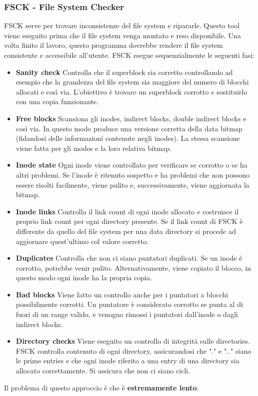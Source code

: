 \documentclass[12pt, twoside, letterpaper]{article}
\begin{document}
			\subsubsection{FSCK - File System Checker}
				FSCK serve per trovare inconsistenze del file system e ripararle. Questo tool viene eseguito prima che il file system venga montato e reso disponibile. Una volta finito il lavoro, questo programma dovrebbe rendere il file system consistente e accessibile all'utente. FSCK esegue sequenzialmente le seguenti fasi:
				\begin{itemize}
					\item \textbf{Sanity check} Controlla che il superblock sia corretto controllando ad esempio che la grandezza del file system sia maggiore del numero di blocchi allocati e così via. L'obiettivo è trovare un superblock corrotto e sostituirlo con una copia funzionante.
					\item \textbf{Free blocks} Scansiona gli inodes, indirect blocks, double indirect blocks e così via. In questo modo produce una versione corretta della data bitmap (fidandosi delle informazioni contenute negli inodes). La stessa scansione viene fatta per gli inodes e la loro relativa bitmap.
					\item \textbf{Inode state} Ogni inode viene controllato per verificare se corrotto o se ha altri problemi. Se l'inode è ritenuto sospetto e ha problemi che non possono essere risolti facilmente, viene pulito e, successivamente, viene aggiornata la bitmap.
					\item \textbf{Inode links} Controlla il link count di ogni inode allocato e costruisce il proprio link count per ogni directory presente. Se il link count di FSCK è differente da quello del file system per una data directory si procede ad aggiornare quest'ultimo col valore corretto.
					\item \textbf{Duplicates} Controlla che non ci siano puntatori duplicati. Se un inode è corrotto, potrebbe venir pulito. Alternativamente, viene copiato il blocco, in questo modo ogni inode ha la propria copia.
					\item \textbf{Bad blocks} Viene fatto un controllo anche per i puntatori a blocchi possibilmente corrotti. Un puntatore è considerato corrotto se punta al di fuori di un range valido, e venogno rimossi i puntatori dall'inode o dagli indirect blocks.
					\item \textbf{Directory checks} Viene eseguito un controllo di integrità sulle directories. FSCK controlla contenuto di ogni directory, assicurandosi che "." e ".." siano le prime entries e che ogni inode riferito a una entry di una directory sia allocato correttamente. Si assicura che non ci siano cicli.
				\end{itemize}
				Il problema di questo approccio è che è \textbf{estremamente lento}.
				
\end{document}
